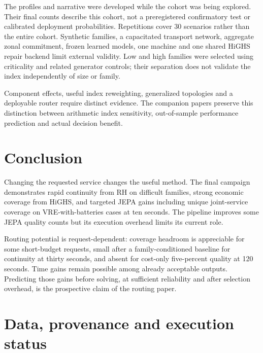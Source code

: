 The profiles and narrative were developed while the cohort was being explored.
Their final counts describe this cohort, not a preregistered confirmatory test
or calibrated deployment probabilities. Repetitions cover 30 scenarios rather
than the entire cohort. Synthetic families, a capacitated transport network,
aggregate zonal commitment, frozen learned models, one machine and one shared
HiGHS repair backend limit external validity. Low and high families were
selected using criticality and related generator controls; their separation
does not validate the index independently of size or family.

Component effects, useful index reweighting, generalized topologies and a
deployable router require distinct evidence. The companion papers preserve
this distinction between arithmetic index sensitivity, out-of-sample
performance prediction and actual decision benefit.

\section{Conclusion}
Changing the requested service changes the useful method. The final campaign
demonstrates rapid continuity from RH on difficult families, strong economic
coverage from HiGHS, and targeted JEPA gains including unique joint-service
coverage on VRE-with-batteries cases at ten seconds. The pipeline improves
some JEPA quality counts but its execution overhead limits its current role.

Routing potential is request-dependent: coverage headroom is appreciable for
some short-budget requests, small after a family-conditioned baseline for
continuity at thirty seconds, and absent for cost-only five-percent quality
at 120 seconds. Time gains remain possible among already acceptable outputs.
Predicting those gains before solving, at sufficient reliability and after
selection overhead, is the prospective claim of the routing paper.

\section*{Data, provenance and execution status}




